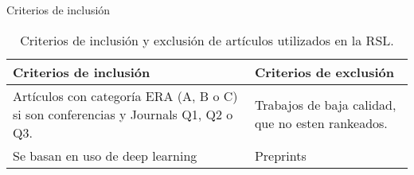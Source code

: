 \documentclass[10pt]{beamer}
\newcommand{\1}{
	\setbeamertemplate{background}{
		\texttt{[image: img/1]}
		\tikz[overlay] \fill[fill opacity=0.75,fill=white] (0,0) rectangle (-\paperwidth,\paperheight);
	}
}
\begin{document}
\begin{frame}{Criterios de inclusión}{}
	
	\begin{table}[H]
		\begin{center}
			\caption{Criterios de inclusión y exclusión de artículos utilizados en la RSL.}
			\label{tab:criterios}
			\setlength{\tabcolsep}{0.5em} %
			{\renewcommand{\arraystretch}{1.2}%
				\begin{tabular}{p{5cm}p{5cm}}
					\textbf{Criterios de inclusión}                                                   & \textbf{Criterios de exclusión}                                                           \\ \hline
					Artículos con categoría ERA (A, B o C) si son conferencias y Journals Q1, Q2 o Q3. & Trabajos de baja calidad, que no esten rankeados.                                      \\
					
					Se basan en uso de deep learning & Preprints \\
					
				\end{tabular}
			}
		\end{center}
	\end{table}
	
\end{frame}
\end{document}
